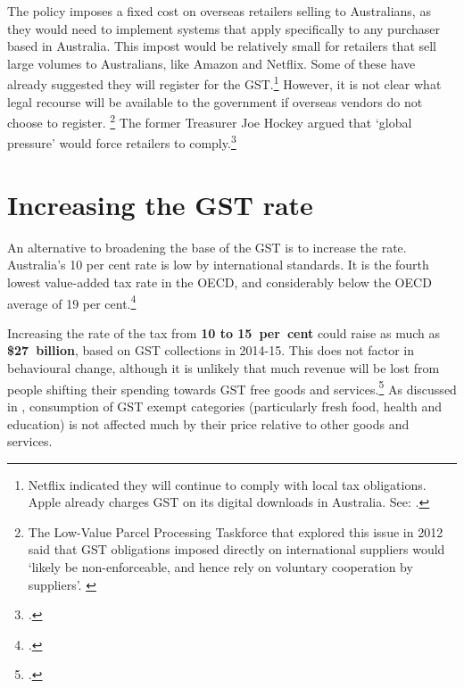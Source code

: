 The policy imposes a fixed cost on overseas retailers selling to Australians, as they would need to implement systems that apply specifically to any purchaser based in Australia. This impost would be relatively small for retailers that sell large volumes to Australians, like Amazon and Netflix. Some of these have already suggested they will register for the GST.\footnote{Netflix indicated they will continue to comply with local tax obligations. Apple already charges GST on its digital downloads in Australia. See: \textcite{Coorey2015-Netflix}.}  However, it is not clear what legal recourse will be available to the government if overseas vendors do not choose to register.%
\footnote{The Low-Value Parcel Processing Taskforce that explored this issue in 2012 said that GST obligations imposed directly on international suppliers would ‘likely be non-enforceable, and hence rely on voluntary cooperation by suppliers’. \textcite[][139]{Treasury2012c}}  The former Treasurer Joe Hockey argued that ‘global pressure’ would force retailers to comply.\footcite{Hockey2015--GST-import-threshold}  

\section{Increasing the GST rate}\label{sec:GST-2-2}
An alternative to broadening the base of the GST is to increase the rate. Australia’s 10 per cent rate is low by international standards. It is the fourth lowest value-added tax rate in the OECD, and considerably below the OECD average of 19 per cent.\footcite{OECDKoreaInstitutePublicFinance2014-Distributional-Effects-Consumption-Taxes}  

Increasing the rate of the tax from \textbf{10 to 15~per~cent} could raise as much as \textbf{\$27~billion}, based on GST collections in 2014-15. This does not factor in behavioural change, although it is unlikely that much revenue will be lost from people shifting their spending towards GST free goods and services.\footcite{KPMGEconotech2011-GST}  As discussed in , consumption of GST exempt categories (particularly fresh food, health and education) is not affected much by their price relative to other goods and services.

